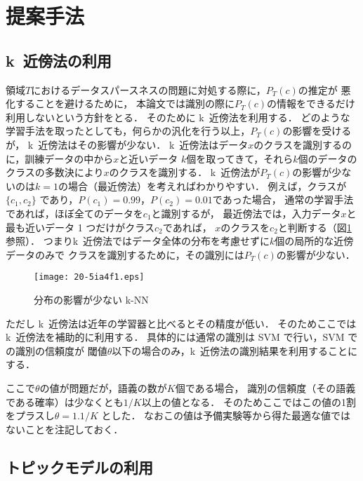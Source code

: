 \documentclass[japanese]{jnlp_1.4}
\begin{document}
\section{提案手法}

\subsection{k~近傍法の利用}

領域\( T \)におけるデータスパースネスの問題に対処する際に，\( P_T (c)\)の推定が
悪化することを避けるために，
本論文では識別の際に\( P_T (c)\)の情報をできるだけ利用しないという方針をとる．
そのために k~近傍法を利用する．
どのような学習手法を取ったとしても，何らかの汎化を行う以上，\( P_T (c)\)の影響を受けるが，
k~近傍法はその影響が少ない．
k~近傍法はデータ\( x \)のクラスを識別するのに，訓練データの中から\( x \)と近いデータ
\( k \)個を取ってきて，それら\( k \)個のデータのクラスの多数決により\( x \)のクラスを識別する．
\mbox{k~近傍法}が\( P_T (c)\)の影響が少ないのは\( k = 1\)の場合（最近傍法）を考えればわかりやすい．
例えば，クラスが\( \{ c_1, c_2 \} \) であり，\( P(c_1) = 0.99 \)，\( P(c_2) = 0.01 \)であった場合，
通常の学習手法であれば，ほぼ全てのデータを\( c_1 \)と識別するが，
最近傍法では，入力データ\( x \)と最も近いデータ 1 つだけがクラス\( c_2 \)であれば，
\( x \)のクラスを\( c_2 \)と判断する（\mbox{図\ref{zu1}}参照）．
つまりk~近傍法ではデータ全体の分布を考慮せずに\( k \)個の局所的な近傍データのみで
クラスを識別するために，その識別には\( P_T (c)\)の影響が少ない．

\begin{figure}[t]
\begin{center}
\texttt{[image: 20-5ia4f1.eps]}
\end{center}
\caption{分布の影響が少ない k-NN}
\label{zu1}
\vspace{-1\Cvs}
\end{figure} 

ただし k~近傍法は近年の学習器と比べるとその精度が低い．
そのためここでは k~近傍法を補助的に利用する．
具体的には通常の識別は SVM で行い，SVM での識別の信頼度が
閾値\( \theta \)以下の場合のみ，k~近傍法の識別結果を利用することにする．

ここで\( \theta \)の値が問題だが，語義の数が\( K \)個である場合，
識別の信頼度（その語義である確率）は少なくとも\( 1/K \)以上の値となる．
そのためここではこの値の1割をプラスし\( \theta = 1.1/K \) とした．
なおこの値は予備実験等から得た最適な値ではないことを注記しておく．



\subsection{トピックモデルの利用}
\end{document}
